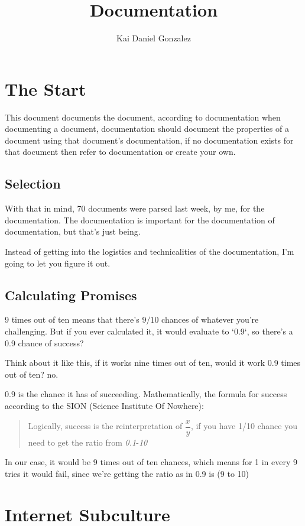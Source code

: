 \documentclass{article} %
\title{Documentation}
\author{Kai Daniel Gonzalez}
\begin{document}
	\maketitle
	\tableofcontents
	\section{The Start}
	This document documents the document, according
	to documentation when documenting a document, documentation
	should document the properties of a document using that document's documentation, if no documentation exists for that document then refer to documentation or create your own.
	\subsection{Selection}
	
	
	With that in mind, 70 documents were parsed last week, by me, for the documentation. The documentation is important for the documentation of documentation, but that's just being.

	Instead of getting into the logistics and technicalities of the documentation, I'm going to let you figure it out.
	
	\subsection{Calculating Promises}
	
	9 times out of ten means that there's \(9/10\) chances of whatever you're challenging. But if you ever calculated it, it would evaluate to `0.9`, so there's a 0.9 chance of success?
	
	Think about it like this, if it works nine times out of ten, would it work 0.9 times out of ten? no.
	
	\(0.9\) is the chance it has of succeeding. Mathematically, the formula for success according to the SION (Science Institute Of Nowhere):
	
	\begin{quote}
		Logically, success is the reinterpretation of \( \dfrac{x}{y}\), if you have 1/10 chance you need to get the ratio from \emph{0.1}-\emph{10}
	\end{quote}

	In our case, it would be 9 times out of ten chances, which means for 1 in every 9 tries it would fail, since we're getting the ratio as in 0.9  is 
  (9 to 10)
	
	\section{Internet Subculture}
	
\end{document}

